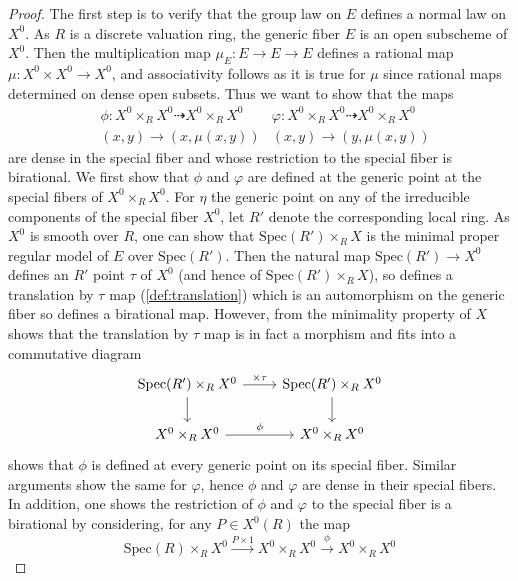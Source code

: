 \documentclass{article}
\theoremstyle{definition}
\theoremstyle{remark}
\theoremstyle{plain}
\begin{document}
\begin{proof}
	The first step is to verify that the group law on $E$ defines a normal law on $X^0$.
	As $R$ is a discrete valuation ring, the generic fiber $E$ is an open subscheme of $X^0$.
	Then the multiplication map $\mu_E: E \to E \to E$ defines a rational map $\mu: X^0 \times X^0 \to X^0$, and associativity follows as it is true for $\mu$ since rational maps determined on dense open subsets.
Thus we want to show that the maps 
	\begin{align*}
			&\phi: X^0 \times_R X^0 \dashrightarrow X^0 \times_R X^0 \quad  &\varphi: X^0 \times_R X^0 \dashrightarrow X^0 \times_R X^0\\
					&(x,y) \to (x, \mu(x,y)) &(x,y) \to (y, \mu(x,y))
		\end{align*}
are dense in the special fiber and whose restriction to the special fiber is birational.\newline
\indent We first show that $\phi$ and $\varphi$ are defined at the generic point at the special fibers of $X^0 \times_R X^0$.
For $\eta$ the generic point on any of the irreducible components of the special fiber $X^0$, let $R'$ denote the corresponding local ring.
As $X^0$ is smooth over $R$, one can show that $\text{Spec}(R') \times_R X$ is the minimal proper regular model of $E$ over $\text{Spec}(R')$.
Then the natural map $\text{Spec}(R') \to X^0$ defines an $R'$ point $\tau$ of $X^0$ (and hence of $\text{Spec}(R') \times_R X$), so defines a translation by $\tau$ map (\ref{def:translation}) which is an automorphism on the generic fiber so defines a birational map.
However, from the minimality property of $X$ shows that the translation by $\tau$ map is in fact a morphism and fits into a commutative diagram
\[\begin{tikzcd}
	{\text{Spec}(R') \times_R X^0} & {\text{Spec}(R') \times_R X^0} \\
	{X^0 \times_R X^0} & {X^0 \times_R X^0}
	\arrow["{\times \tau}", from=1-1, to=1-2]
	\arrow[from=1-1, to=2-1]
	\arrow[from=1-2, to=2-2]
	\arrow["\phi", from=2-1, to=2-2]
\end{tikzcd}\]
shows that $\phi$ is defined at every generic point on its special fiber.
Similar arguments show the same for $\varphi$, hence $\phi$ and $\varphi$ are dense in their special fibers.
In addition, one shows the restriction of $\phi$ and $\varphi$ to the special fiber is a birational by considering, for any $P \in X^0(R)$ the map
\[\text{Spec}(R) \times_R X^0 \xrightarrow{P \times 1} X^0 \times_R X^0 \xrightarrow{\phi} X^0 \times_R X^0\]

\end{proof}
\end{document}
